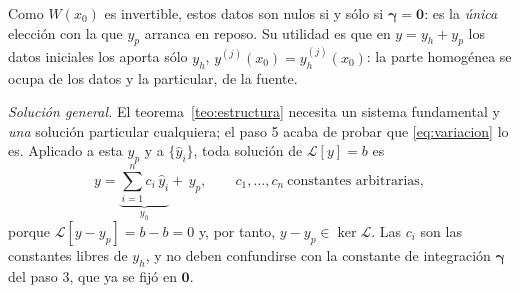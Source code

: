 \documentclass[11pt,twoside]{article}
\newcommand\Lop{\mathcal L}
\newcommand\yh{\hat y}
\newcommand\vgamma{\bm\gamma}
\begin{document}
\begin{demostracion}
\begin{pasos}[resume]
\begin{equation*}
\end{equation*}
Como $W(x_0)$ es invertible, estos datos son nulos si y sólo si $\vgamma=\bm0$: es la \emph{única} elección con la que
$y_p$ arranca en reposo. Su utilidad es que en $y=y_h+y_p$ los datos iniciales los aporta sólo $y_h$,
$y^{(j)}(x_0)=y_h^{(j)}(x_0)$: la parte homogénea se ocupa de los datos y la particular, de la fuente.
\item \emph{Solución general.} El teorema~\ref{teo:estructura} necesita un sistema fundamental y \emph{una} solución
particular cualquiera; el paso 5 acaba de probar que \eqref{eq:variacion} lo es. Aplicado a esta $y_p$ y a $\{\yh_i\}$, toda
solución de $\Lop[y]=b$ es
\begin{equation*}
y=\underbrace{\sum_{i=1}^{n}c_i\,\yh_i}_{y_h}+\,y_p,\qquad c_1,\dots,c_n\ \text{constantes arbitrarias},
\end{equation*}
porque $\Lop[y-y_p]=b-b=0$ y, por tanto, $y-y_p\in\ker\Lop$. Las $c_i$ son las constantes libres de $y_h$, y no deben
confundirse con la constante de integración $\vgamma$ del paso 3, que ya se fijó en $\bm0$.
\end{pasos}
\end{demostracion}
\end{document}

